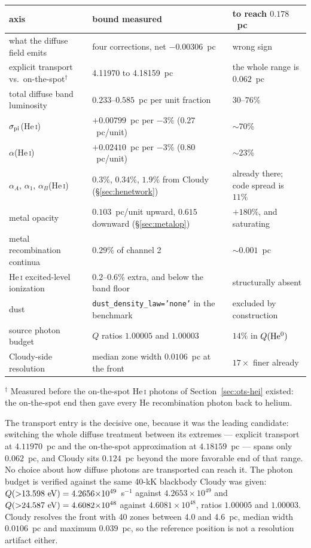\documentclass[english,a4paper]{my_memo}
\newcommand{\code}[1]{\texttt{#1}}
\begin{document}
\begin{center}\small
\begin{tabular}{@{}lll@{}}
\toprule
axis & bound measured & to reach $0.178$~pc \\
\midrule
what the diffuse field emits & four corrections, net $-0.00306$~pc
  & wrong sign \\
explicit transport vs.\ on-the-spot$^\dagger$ & 4.11970 to 4.18159~pc
  & the whole range is $0.062$~pc \\
total diffuse band luminosity & $0.233$--$0.585$~pc per unit fraction
  & $30$--$76\%$ \\
$\sigma_{\rm pi}$(He\,\textsc{i}) & $+0.00799$~pc per $-3\%$ ($0.27$~pc/unit)
  & ${\sim}70\%$ \\
$\alpha$(He\,\textsc{i}) & $+0.02410$~pc per $-3\%$ ($0.80$~pc/unit)
  & ${\sim}23\%$ \\
$\alpha_A$, $\alpha_1$, $\alpha_B$(He\,\textsc{i})
  & $0.3\%$, $0.34\%$, $1.9\%$ from Cloudy (\S\ref{sec:henetwork})
  & already there; code spread is $11\%$ \\
metal opacity & $0.103$~pc/unit upward, $0.615$ downward
  (\S\ref{sec:metalop}) & $+180\%$, and saturating \\
metal recombination continua & $0.29\%$ of channel 2 & ${\sim}0.001$~pc \\
He\,\textsc{i} excited-level ionization & $0.2$--$0.6\%$ extra, and below the
  band floor & structurally absent \\
dust & \code{dust\_density\_law='none'} in the benchmark & excluded by construction \\
source photon budget & $Q$ ratios $1.00005$ and $1.00003$ & $14\%$ in
  $Q({\rm He^0})$ \\
Cloudy-side resolution & median zone width $0.0106$~pc at the front
  & $17\times$ finer already \\
\bottomrule
\end{tabular}

\smallskip
{\footnotesize $^\dagger$ Measured before the on-the-spot He\,\textsc{i}
photons of Section~\ref{sec:ots-hei} existed: the on-the-spot end then gave
every He recombination photon back to helium.}
\end{center}
The transport entry is the decisive one, because it was the leading candidate:
switching the whole diffuse treatment between its extremes --- explicit
transport at $4.11970$~pc and the on-the-spot approximation at $4.18159$~pc
--- spans only $0.062$~pc, and Cloudy sits $0.124$~pc beyond the more
favorable end of that range.  No choice about how diffuse photons are
transported can reach it.  The photon budget is verified against the same
40-kK blackbody Cloudy was given: $Q({>}13.598~{\rm eV}) =
4.2656{\times}10^{49}$~s$^{-1}$ against $4.2653{\times}10^{49}$ and
$Q({>}24.587~{\rm eV}) = 4.6082{\times}10^{48}$ against
$4.6081{\times}10^{48}$, ratios $1.00005$ and $1.00003$.  Cloudy resolves the
front with 40 zones between 4.0 and 4.6~pc, median width $0.0106$~pc and
maximum $0.039$~pc, so the reference position is not a resolution artifact
either.
\end{document}
